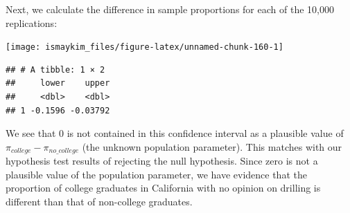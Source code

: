 \documentclass[]{tufte-book}
\newenvironment{Shaded}{\begin{snugshade}}{\end{snugshade}}
\newcommand{\KeywordTok}[1]{\textcolor[rgb]{0.13,0.29,0.53}{\textbf{{#1}}}}
\newcommand{\DataTypeTok}[1]{\textcolor[rgb]{0.13,0.29,0.53}{{#1}}}
\newcommand{\DecValTok}[1]{\textcolor[rgb]{0.00,0.00,0.81}{{#1}}}
\newcommand{\FloatTok}[1]{\textcolor[rgb]{0.00,0.00,0.81}{{#1}}}
\newcommand{\StringTok}[1]{\textcolor[rgb]{0.31,0.60,0.02}{{#1}}}
\newcommand{\NormalTok}[1]{{#1}}
\begin{document}
Next, we calculate the difference in sample proportions for each of the
10,000 replications:

\begin{Shaded}
\end{Shaded}

\begin{Shaded}
\end{Shaded}

\begin{center}\texttt{[image: ismaykim\_files/figure-latex/unnamed-chunk-160-1]} \end{center}

\begin{Shaded}
\end{Shaded}

\begin{verbatim}
## # A tibble: 1 × 2
##     lower    upper
##     <dbl>    <dbl>
## 1 -0.1596 -0.03792
\end{verbatim}

We see that 0 is not contained in this confidence interval as a
plausible value of \(\pi_{college} - \pi_{no\_college}\) (the unknown
population parameter). This matches with our hypothesis test results of
rejecting the null hypothesis. Since zero is not a plausible value of
the population parameter, we have evidence that the proportion of
college graduates in California with no opinion on drilling is different
than that of non-college graduates.
\end{document}
